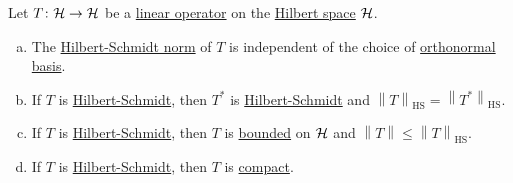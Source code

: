 \begin{proposition}
	Let \(T\colon \mathcal{\MakeUppercase{h}} \to \mathcal{\MakeUppercase{h}} \) be a \hyperref[def:linear-op]{linear operator} on the \hyperref[def:Hilbert-space]{Hilbert space} \(\mathcal{\MakeUppercase{h}} \).
	\begin{enumerate}[(a)]
		\item The \hyperref[def:Hilbert-Schmidt-norm]{Hilbert-Schmidt norm} of \(T\) is independent of the choice of \hyperref[def:orthonormal-system]{orthonormal basis}.
		\item If \(T\) is \hyperref[def:Hilbert-Schmidt-op]{Hilbert-Schmidt}, then \(T^{\ast} \) is \hyperref[def:Hilbert-Schmidt-op]{Hilbert-Schmidt} and \(\left\lVert T\right\rVert _{\mathrm{HS} } = \left\lVert T^{\ast} \right\rVert_{\mathrm{HS} } \).
		\item If \(T\) is \hyperref[def:Hilbert-Schmidt-op]{Hilbert-Schmidt}, then \(T\) is \hyperref[def:bounded-linear-op]{bounded} on \(\mathcal{\MakeUppercase{h}} \) and \(\left\lVert T\right\rVert \leq \left\lVert T\right\rVert _{\mathrm{HS} }\).
		\item If \(T\) is \hyperref[def:Hilbert-Schmidt-op]{Hilbert-Schmidt}, then \(T\) is \hyperref[def:compact-op]{compact}.
	\end{enumerate}
\end{proposition}
